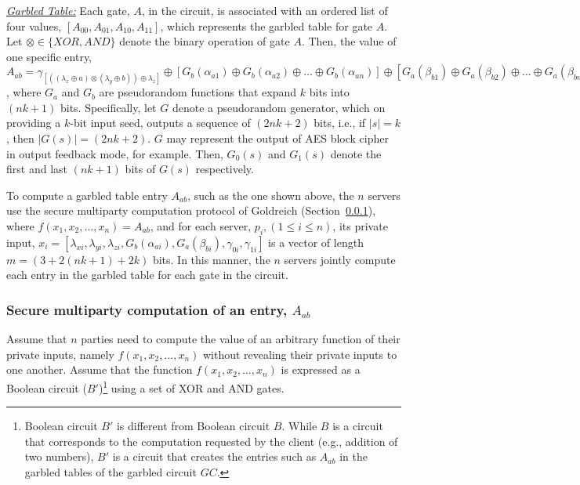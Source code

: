 \documentclass[10pt,journal,cspaper,compsoc]{IEEEtran}
\begin{document}
\underline{\em Garbled Table:} Each gate, $A$, in the circuit, is associated with an ordered list of four values, $[A_{00}, A_{01}, A_{10}, A_{11}]$, which represents the garbled table for gate $A$. Let $\otimes \in \{XOR,AND\}$ denote the binary operation of gate $A$. Then, the value of one specific entry, $A_{ab} = \gamma_{[((\lambda_x \oplus a) \otimes (\lambda_y \oplus b)) \oplus \lambda_z]} \oplus [G_b(\alpha_{a1})\oplus G_b(\alpha_{a2})\oplus \ldots \oplus G_b(\alpha_{an})]\oplus [G_a(\beta_{b1})\oplus G_a(\beta_{b2})\oplus \ldots \oplus G_a(\beta_{bn})]$, where $G_a$ and $G_b$ are pseudorandom functions that expand $k$ bits into $(nk+1)$ bits. Specifically, let $G$ denote a pseudorandom generator, which on providing a $k$-bit input seed, outputs a sequence of $(2nk+2)$ bits, i.e., if $|s|=k$, then $|G(s)|=(2nk+2)$. $G$ may represent the output of AES block cipher in output feedback mode, for example. Then, $G_0(s)$ and $G_1(s)$ denote the first and last $(nk+1)$ bits of $G(s)$ respectively.


To compute a garbled table entry $A_{ab}$, such as the one shown above, the $n$ servers use the secure multiparty computation protocol of Goldreich \cite{goldreich04,goldreich87} (Section~\ref{sec_secure_multiparty_construction_Goldreich}), where $f(x_1, x_2, \ldots, x_n) = A_{ab}$, and for each server, $p_i, (1\le i \le n)$, its private input, $x_i = [\lambda_{xi}, \lambda_{yi}, \lambda_{zi}, G_b(\alpha_{ai}), G_a(\beta_{bi}), \gamma_{0i}, \gamma_{1i}]$ is a vector of length $m=(3+2(nk+1)+2k)$ bits. In this manner, the $n$ servers jointly compute each entry in the garbled table for each gate in the circuit.



\subsubsection{Secure multiparty computation of an entry, $A_{ab}$}
\label{sec_secure_multiparty_construction_Goldreich}

Assume that $n$ parties need to compute the value of an arbitrary function of their private inputs, namely $f(x_1, x_2, \ldots, x_n)$ without revealing their private inputs to one another. Assume that the function $f(x_1, x_2, \ldots, x_n)$ is expressed as a Boolean circuit ($B'$)\footnote{Boolean circuit $B'$ is different from Boolean circuit $B$. While $B$ is a circuit that corresponds to the computation requested by the client (e.g., addition of two numbers), $B'$ is a circuit that creates the entries such as $A_{ab}$ in the garbled tables of the garbled circuit $GC$.} using a set of XOR and AND gates.
\end{document}
